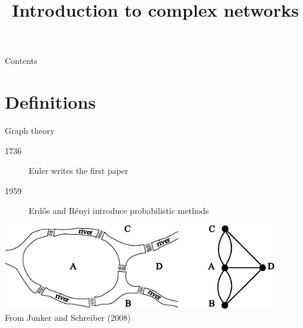 

\title{Introduction to complex networks}

\newcommand{\set}[1]{\ensuremath{\mathcal{#1}}}

\renewcommand{\vec}[1]{\ensuremath{\mathbf{#1}}}
\newcommand{\mat}[1]{\ensuremath{\vec{#1}}}
\newcommand{\tr}{\ensuremath{\intercal}}

\newcommand{\R}{\ensuremath{\mathbb{R}}}
\newcommand{\N}{\ensuremath{\mathcal{N}}}



\maketitle

\begin{frame}{Contents}
    \tableofcontents[hideallsubsections]
\end{frame}

\section{Definitions}

\begin{frame}{Graph theory}
    \begin{description}
        \item[1736] Euler writes the first paper
        \item[1959] Erdős and Rényi introduce probabilistic methods
    \end{description}
    \vfill
    \begin{center}
        \includegraphics[height=10em]{figures/seven_bridges} \\
        {\scriptsize%
         From Junker and Schreiber (2008)}
    \end{center}
\end{frame}


